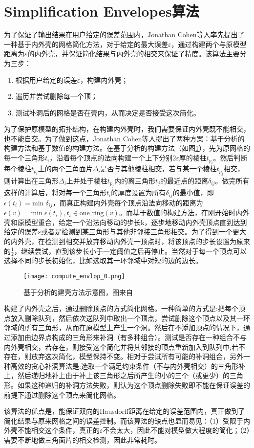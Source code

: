 \section{Simplification Envelopes算法}
为了保证了输出结果在用户给定的误差范围内，Jonathan Cohen等人率先提出了一种基于内外壳的网格简化方法\cite{simp-envlop}，对于给定的最大误差$\varepsilon$，通过构建两个与原模型距离为$\varepsilon$的内外壳，并保证简化结果与内外壳的相交来保证了精度。该算法主要分为三步：
\begin{enumerate}[（1）]
  \item 根据用户给定的误差$\varepsilon$，构建内外壳；
  \item 遍历并尝试删除每一个顶；
  \item 测试补洞后的网格是否在壳内，从而决定是否接受这次简化。
\end{enumerate}
为了保护原模型的拓扑结构，在构建内外壳时，我们需要保证内外壳既不能相交，也不能自交。为了做到这点，Jonathan Cohen等人提出了两种方案：基于分析的构建方法和基于数值的构建方法。在基于分析的构建方法（如图\ref{fig:compute-envlop0}），先为原网格的每一个三角形$t_i$，沿着每个顶点的法向构建一个上下分别$2\varepsilon$厚的棱柱$t_{p_i}$。然后判断每个棱柱$t_{p_i}$上的两个三角面片$\Delta_i$是否与其他棱柱相交，若与某一个棱柱$t_{p_j}$相交，则计算出在三角形$\Delta_i$上并处于棱柱$t_{p_j}$内的离三角形$t_j$的最近点的距离$\delta_{ij}$。做完所有这样的计算后，将对每一个三角形$t_i$的厚度设置为所有$\delta_{ij}$的最小值，即$\epsilon(t_i) = \text{min} \; \delta_{ij}$，而真正构建内外壳每个顶点沿法向移动的距离为$\epsilon(v) = \text{min} \; \epsilon(t_i),t_i \in \text{one\_ring}(v)$。而基于数值的构建方法，在刚开始时内外壳和原模型重合，给定一个沿法向移动的步长k，逐步地移动内外壳顶点直到达到给定的误差ε或者是检测到某三角形与其他非邻接三角形相交。为了得到一个更大的内外壳，在检测到相交并放弃移动内外壳一顶点时，将该顶点的步长设置为原来的$\frac{1}{2}$，继续尝试，直到该步长小于一定阈值之后再停止。当然对于每一个顶点可以选择不同的步长初始化，比如选取其一环邻域中对短的边的边长。\par
\begin{figure}[htbp]
    \centering
    \texttt{[image: compute\_envlop\_0.png]}
    \caption[分析建壳方法]{基于分析的建壳方法示意图，图来自\cite{simp-envlop}}
    \label{fig:compute-envlop0}
\end{figure}
构建了内外壳之后，通过删除顶点的方式简化网格。一种简单的方式是:把每个顶点放入删除队列，然后依次送队列中取出一个顶点，尝试删除这个顶点以及其一环邻域的所有三角形，从而在原模型上产生一个洞。然后在不添加顶点的情况下，通过添加由边界点构成的三角形来补洞（有多种组合）。测试是否存在一种组合不与内外壳相交，若存在，则接受这个简化并将其邻接的顶点重新加入到队列中;若不存在，则放弃这次简化，模型保持不变。相对于尝试所有可能的补洞组合，另外一种高效的贪心补洞算法是:选取一个满足约束条件（不与内外壳相交）的三角形补上，然后递归地补上由于补上该三角形之后所产生的小的三个（或更少）的三角形。如果这种递归的补洞方法失败，则认为这个顶点删除失败即不能在保证误差的前提下通过删除这个顶点来简化网格。\par
该算法的优点是，能保证双向的Hausdorff距离在给定的误差范围内，真正做到了简化结果与原来网格之间的误差控制。而该算法的缺点也显而易见：（1）受限于内外壳不能相交这个条件，真正的$\varepsilon$不会太大，因此不能对模型做大程度的简化；（2）需要不断地做三角面片的相交检测，因此非常耗时。

